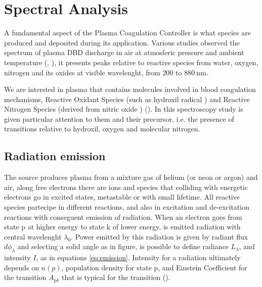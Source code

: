 \chapter{Spectral Analysis}
\label{ch:spettro}
A fundamental aspect of the Plasma Coagulation Controller is what species are produced and deposited during its application. Various studies observed the spectrum of plasma DBD discharge in air at atmosferic pressure and ambient temperature (\cite{DBDair_Trot}, \cite{DBDAirTypicalSpec}), it presents peaks relative to reactive species from water, oxygen, nitrogen and its oxides at visible wavelenght, from $\num{200}$ to $\SI{880}{\nano\meter}$.

We are intersted in plasma that contains molecules involved in blood coagulation mechanisms, Reactive Oxidant Species (such as hydroxil radical ) and Reactive Nitrogen Species (derived from nitric oxide ) (\cite{6153386}). In this spectroscopy study is given particular attention to them and their precursor, i.e. the presence of transitions relative to hydroxil, oxygen and molecular nitrogen.


\section{Radiation emission}
The source produces plasma from a mixture gas of helium (or neon or argon) and air, along free electrons there are ions and species that colliding with energetic electrons go in excited states, metastable or with small lifetime. All reactive species partecipe in different reactions, and also in excitation and de-excitation reactions with conseguent emission of radiation. When an electron goes from state p at higher energy to state k of lower energy, is emitted radiation with central wavelenght $\lambda_0$. Power emitted by this radiation is given by radiant flux $d\phi_{\lambda}$ and selecting a solid angle as in figure, is possible to define radiance $L_{\lambda}$, and intensity $I$, as in equations \ref{eq:emission}. Intensity for a radiation ultimately depends on $n(p)$, population density for state p, and Einstein Coefficient for the transition $A_{pk}$ that is typical for the transition (\cite{book:291477}).

